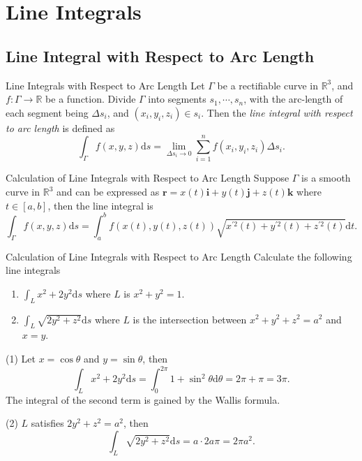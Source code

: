 
\section{Line Integrals}

\subsection{Line Integral with Respect to Arc Length}

\begin{definition}{Line Integrals with Respect to Arc Length}{}
  Let $\Gamma$ be a rectifiable curve in $\mathbb{R}^3$,
  and $f: \Gamma \rightarrow \mathbb{R}$ be a function.
  Divide $\Gamma$ into segments $s_1,\cdots,s_n$, with the arc-length of each
  segment being $\Delta s_i$, and $(x_i, y_i, z_i) \in s_i$.
  Then the \emph{line integral with respect to arc length} is defined as
  \begin{equation}
    \int_{\Gamma} f(x,y,z)\mathrm{d} s = \lim \limits _{\Delta s_i \rightarrow 0}
    \sum\limits_{i = 1}^n f(x_i, y_i, z_i) \Delta s_i.
  \end{equation}
\end{definition}

\begin{proposition}{Calculation of Line Integrals with Respect to Arc Length}{}
  Suppose $\Gamma$ is a smooth curve in $\mathbb{R}^3$ and can be expressed as
  $\mathbf{r} = x(t)\mathbf{i} + y(t)\mathbf{j} + z(t)\mathbf{k}$ where $t \in
  [a, b]$, then the line integral is
  \begin{equation}
    \int_{\Gamma} f(x,y,z) \mathrm{d} s = \int_a^b f(x(t), y(t), z(t))
    \sqrt{x^{\prime 2}(t) + y^{\prime 2}(t) + z^{\prime 2}(t)}\mathrm{d} t.
  \end{equation}
\end{proposition}

\begin{example}{Calculation of Line Integrals with Respect to Arc Length}{}
  Calculate the following line integrals
  \begin{enumerate}
  \item $\int_L x^2 + 2y^2 \mathrm{d} s$ where $L$ is $x^2 + y^2 = 1$.
  \item $\int_L \sqrt{2y^2 + z^2}\mathrm{d}s$ where $L$ is the intersection
    between $x^2 + y^2 + z^2 = a^2$ and $x = y$.
  \end{enumerate}
\end{example}

\begin{solution}
  (1) Let $x = \cos \theta$ and $y = \sin \theta$, then
  \begin{equation}
    \int_L x^2 + 2y^2 \mathrm{d} s = \int_0^{2\pi} 1 + \sin^2 \theta \mathrm{d} \theta
    = 2\pi + \pi = 3\pi.
  \end{equation}
  The integral of the second term is gained by the Wallis formula.

  (2) $L$ satisfies $2y^2 + z^2 = a^2$,
  then
  \begin{equation}
    \int_L \sqrt{2y^2 + z^2}\mathrm{d} s = a \cdot 2a\pi = 2\pi a^2.
  \end{equation}
\end{solution}

